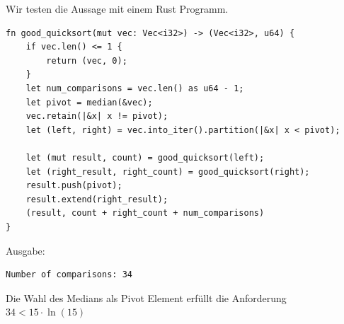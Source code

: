 \documentclass[a4paper]{scrartcl}
\begin{document}
Wir testen die Aussage mit einem Rust Programm.
\begin{lstlisting}
fn good_quicksort(mut vec: Vec<i32>) -> (Vec<i32>, u64) {
	if vec.len() <= 1 {
		return (vec, 0);
	}
	let num_comparisons = vec.len() as u64 - 1;
	let pivot = median(&vec);
	vec.retain(|&x| x != pivot);
	let (left, right) = vec.into_iter().partition(|&x| x < pivot);

	let (mut result, count) = good_quicksort(left);
	let (right_result, right_count) = good_quicksort(right);
	result.push(pivot);
	result.extend(right_result);
	(result, count + right_count + num_comparisons)
}
\end{lstlisting}
Ausgabe:
\begin{lstlisting}
Number of comparisons: 34
\end{lstlisting}
Die Wahl des Medians als Pivot Element erfüllt die Anforderung $34 < 15 \cdot \ln(15)$
\end{document}
